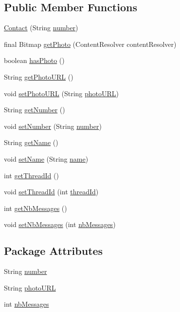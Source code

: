 \subsection*{Public Member Functions}
\begin{DoxyCompactItemize}
\item 
\hyperlink{a00005_a338f8ea370a08d4566739c2950bf1bd7}{Contact} (String \hyperlink{a00005_a59be7928addfd6c2307fa665d9d0eb3a}{number})
\item 
final Bitmap \hyperlink{a00005_a589071d4450e576bcf705b147a5d8dfc}{get\+Photo} (Content\+Resolver content\+Resolver)
\item 
boolean \hyperlink{a00005_a6f861ae47c26fefab4e8e0cea9a1c979}{has\+Photo} ()
\item 
String \hyperlink{a00005_acb254f588afdb1371b7fcf708e8e665d}{get\+Photo\+U\+R\+L} ()
\item 
void \hyperlink{a00005_a26188abec636b2754749851d108157c9}{set\+Photo\+U\+R\+L} (String \hyperlink{a00005_a6300d0c52298ebf7049df45c04ca1879}{photo\+U\+R\+L})
\item 
String \hyperlink{a00005_ae03bcf255a5fc2f7d29438a9a310144e}{get\+Number} ()
\item 
void \hyperlink{a00005_a5248a434af8755dc41918e83e8cbe2cc}{set\+Number} (String \hyperlink{a00005_a59be7928addfd6c2307fa665d9d0eb3a}{number})
\item 
String \hyperlink{a00005_a78ee178b6a73658d65ca60da4d1e6683}{get\+Name} ()
\item 
void \hyperlink{a00005_ad737b36b74be994e0d8420797ed72f78}{set\+Name} (String \hyperlink{a00005_a9a2326f35466e54c36c070829245c557}{name})
\item 
int \hyperlink{a00005_ad0e00784944089a9ece0934817c8976b}{get\+Thread\+Id} ()
\item 
void \hyperlink{a00005_a0d24ce5a0d8f054366321a58db5d4d0a}{set\+Thread\+Id} (int \hyperlink{a00005_afdf9018750ccb340d2173b2a3da1e755}{thread\+Id})
\item 
int \hyperlink{a00005_ab2e6122640650f7b784fabadd00f823a}{get\+Nb\+Messages} ()
\item 
void \hyperlink{a00005_a5bad44419074a927bf68c94245f36890}{set\+Nb\+Messages} (int \hyperlink{a00005_a88c965ed9f3385173d81f6bd02caac09}{nb\+Messages})
\end{DoxyCompactItemize}
\subsection*{Package Attributes}
\begin{DoxyCompactItemize}
\item 
String \hyperlink{a00005_a59be7928addfd6c2307fa665d9d0eb3a}{number}
\item 
String \hyperlink{a00005_a6300d0c52298ebf7049df45c04ca1879}{photo\+U\+R\+L}
\item 
int \hyperlink{a00005_a88c965ed9f3385173d81f6bd02caac09}{nb\+Messages}
\end{DoxyCompactItemize}
